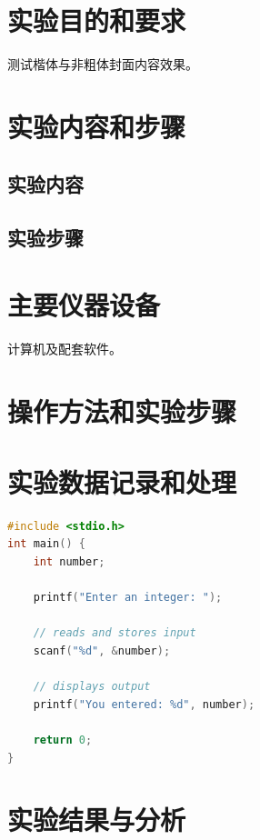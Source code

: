 \documentclass[codeformat]{zjureport}
\date{\zhtoday}
\begin{document}
\makecover
\makeheader
\section{实验目的和要求}
测试楷体与非粗体封面内容效果。

\section{实验内容和步骤}

\subsection{实验内容}

\subsection{实验步骤}

\section{主要仪器设备}
计算机及配套软件。

\section{操作方法和实验步骤}

\section{实验数据记录和处理}

\begin{lstlisting}[language=C]
#include <stdio.h>
int main() {
    int number;

    printf("Enter an integer: ");

    // reads and stores input
    scanf("%d", &number);

    // displays output
    printf("You entered: %d", number);

    return 0;
}
\end{lstlisting}

\section{实验结果与分析}
\end{document}
